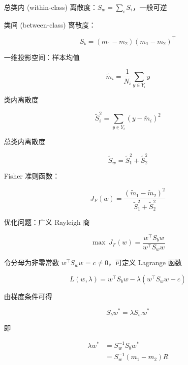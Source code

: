 \documentclass[openany,a4paper,12pt]{ctexbook}
\theoremstyle{kaiti}
\theoremstyle{normal}
\begin{document}
总类内 (within-class) 离散度：$S_w=\sum_iS_i$，一般可逆

类间 (between-class) 离散度：

\begin{equation}
S_b=\left(m_1-m_2 \right)\left(m_1-m_2 \right)^{\top}
\end{equation}

一维投影空间：样本均值

\begin{equation}
\tilde{m}_i=\frac{1}{N_i}\sum_{y\in Y_i}y
\end{equation}

类内离散度

\begin{equation}
\tilde{S}_{i}^{2}=\sum_{y\in Y_i}\left(y-\tilde{m}_i \right)^2
\end{equation}

总类内离散度

\begin{equation}
\tilde{S}_w=\tilde{S}_{1}^{2}+\tilde{S}_{2}^{2}
\end{equation}

Fisher 准则函数：

\begin{equation}
J_F\left(w \right)=\frac{\left(\tilde{m}_1-\tilde{m}_2 \right)^2}{\tilde{S}_{1}^{2}+\tilde{S}_{2}^{2}}
\end{equation}

优化问题：广义 Rayleigh 商

\begin{equation}
\max~J_F\left(w \right)=\frac{w^{\top}S_bw}{w^{\top}S_ww}
\end{equation}

令分母为非零常数 $w^{\top}S_ww=c\ne 0$，可定义 Lagrange 函数

\begin{equation}
L\left(w,\lambda \right)=w^{\top}S_bw-\lambda \left(w^{\top}S_ww-c \right)
\end{equation}

由梯度条件可得

\begin{equation}
S_bw^*=\lambda S_ww^*
\end{equation}

即

\begin{equation}
\begin{aligned}
  \lambda w^*
  &=S_{w}^{-1}S_bw^*\\
  &=S_{w}^{-1}\left(m_1-m_2 \right)R
\end{aligned}
\end{equation}
\end{document}
